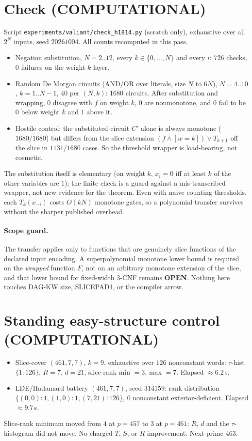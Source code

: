 \documentclass[11pt]{article}
\begin{document}
\section*{Check (COMPUTATIONAL)}
Script \texttt{experiments/valiant/check\_h1814.py} (scratch only), exhaustive over all $2^N$ inputs, seed $20261004$. All counts recomputed in this pass.
\begin{itemize}
\item Negation substitution, $N=2..12$, every $k\in\{0,\dots,N\}$ and every $i$: $726$ checks, $0$ failures on the weight-$k$ layer.
\item Random De Morgan circuits (AND/OR over literals, size $N$ to $6N$), $N=4..10$, $k=1..N-1$, $40$ per $(N,k)$: $1680$ circuits. After substitution and wrapping, $0$ disagree with $f$ on weight $k$, $0$ are nonmonotone, and $0$ fail to be $0$ below weight $k$ and $1$ above it.
\item Hostile control: the substituted circuit $C'$ alone is always monotone ($1680/1680$) but differs from the slice extension $(f\wedge[w{=}k])\vee T_{k+1}$ off the slice in $1131/1680$ cases. So the threshold wrapper is load-bearing, not cosmetic.
\end{itemize}
The substitution itself is elementary (on weight $k$, $x_i=0$ iff at least $k$ of the other variables are $1$); the finite check is a guard against a mis-transcribed wrapper, not new evidence for the theorem. Even with naive counting thresholds, each $T_k(x_{-i})$ costs $O(kN)$ monotone gates, so a polynomial transfer survives without the sharper published overhead.

\paragraph{Scope guard.} The transfer applies only to functions that are genuinely slice functions of the declared input encoding. A superpolynomial monotone lower bound is required on the \emph{wrapped} function $F$, not on an arbitrary monotone extension of the slice, and that lower bound for fixed-width 3-CNF remains \textbf{OPEN}. Nothing here touches DAG-KW size, SLICEPAD1, or the compiler arrow.

\section*{Standing easy-structure control (COMPUTATIONAL)}
\begin{itemize}
\item Slice-cover $(461,7,7)$, $k=9$, exhaustive over $126$ nonconstant words: $\tau$-hist $\{1{:}126\}$, $R=7$, $d=21$, slice-rank min $=3$, max $=7$. Elapsed $\approx6.2$\,s.
\item LDE/Hadamard battery $(461,7,7)$, seed $314159$: rank distribution $\{(0,0){:}1,(1,0){:}1,(7,21){:}126\}$, $0$ nonconstant exterior-deficient. Elapsed $\approx9.7$\,s.
\end{itemize}
Slice-rank minimum moved from $4$ at $p=457$ to $3$ at $p=461$; $R$, $d$ and the $\tau$-histogram did not move. No charged $T$, $S$, or $R$ improvement. Next prime $463$.
\end{document}
